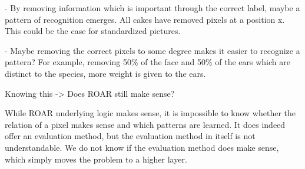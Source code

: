 - By removing information which is important through the correct label, maybe a pattern of recognition emerges.
All cakes have removed pixels at a position x. This could be the case for standardized pictures.

- Maybe removing the correct pixels to some degree makes it easier to recognize a pattern? For example, removing 50\% of the face and 50\% of the ears which are distinct to the species, more weight is given to the ears.



Knowing this -> Does ROAR still make sense?

While ROAR underlying logic makes sense, it is impossible to know whether the relation of a pixel makes sense and which patterns are learned. It does indeed offer an evaluation method, but the evaluation method in itself is not understandable. We do not know if the evaluation method does make sense, which simply moves the problem to a higher layer.





